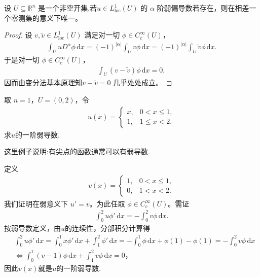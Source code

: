 \documentclass[../../main.tex]{subfiles}
\begin{document}
\begin{lemma}[弱导数的唯一性]\label{lemma:ch05-弱导数唯一性}
设 $U \subseteq \mathbb{R}^n$ 是一个非空开集,若$u\in L_{\mathrm{loc}}^1(U)$ 的 $\alpha$ 阶弱偏导数若存在，则在相差一个零测集的意义下唯一。
\end{lemma}
\begin{proof}
设 $v,\widetilde{v}\in L^{1}_{\mathrm{loc}}(U)$ 满足对一切 $\phi\in C^{\infty}_{c}(U)$，
\begin{align*}
\int_{U}uD^{\alpha}\phi\,\mathrm{d}x=(-1)^{|\alpha|}\int_{U}v\phi\,\mathrm{d}x=(-1)^{|\alpha|}\int_{U}\widetilde{v}\phi\,\mathrm{d}x.
\end{align*}
于是对一切 $\phi\in C^{\infty}_{c}(U)$，
\begin{align*}
\int_{U}(v-\widetilde{v})\phi\,\mathrm{d}x=0,
\end{align*}
因而由\hyperref[lemma:变分法基本原理]{变分法基本原理}知$v-\widetilde{v}=0$ 几乎处处成立。
\end{proof}

\begin{example}\label{example:ch05-弱导例1}
取 $n=1$，$U=(0,2)$，令
\begin{align*}
u(x)=
\begin{cases}
x, & 0<x\leqslant 1,\\
1, & 1\leqslant x<2.
\end{cases}
\end{align*}
求$u$的一阶弱导数.
\end{example}
\begin{remark}
这里例子说明:有尖点的函数通常可以有弱导数.
\end{remark}
\begin{solution}
定义
\begin{align*}
v(x)=
\begin{cases}
1, & 0<x\leqslant 1,\\
0, & 1<x<2.
\end{cases}
\end{align*}
我们证明在弱意义下 $u'=v$。为此任取 $\phi\in C^{\infty}_{c}(U)$。需证
\begin{align*}
\int_{0}^{2}u\phi'\,\mathrm{d}x=-\int_{0}^{2}v\phi\,\mathrm{d}x.
\end{align*}
按弱导数定义，由$u$的连续性，分部积分计算得
\begin{align*}
&\int_{0}^{2}u\phi'\,\mathrm{d}x
=\int_{0}^{1}x\phi'\,\mathrm{d}x+\int_{1}^{2}\phi'\,\mathrm{d}x
=-\int_{0}^{1}\phi\,\mathrm{d}x+\phi(1)-\phi(1)
=-\int_{0}^{2}v\phi\,\mathrm{d}x
\\
&\Longleftrightarrow \int_0^1{\left( v-1 \right) \phi \,\mathrm{d}x}+\int_1^2{v\phi \,\mathrm{d}x}=0，
\end{align*}
因此$v(x)$就是$u$的一阶弱导数.
\end{solution}
\end{document}
